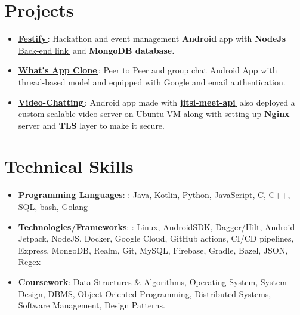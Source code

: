 \documentclass[letterpaper,11pt]{article}
\let\orighref\href
\renewcommand{\href}[2]{\orighref{#1}{#2\,\faExternalLink}}
\newcommand{\resumeItem}[2]{
  \item\small{
    \textbf{#1}{: #2 \vspace{-2pt}}
  }
}
\newcommand{\resumeSubHeadingListStart}{\begin{itemize}[leftmargin=*]}
\newcommand{\resumeSubHeadingListEnd}{\end{itemize}}
\begin{document}
\section{Projects}
\resumeSubHeadingListStart
\resumeItem{\href{https://github.com/yash10019coder/festify-android}{Festify}}
{Hackathon and event management \textbf{Android} app with \textbf{NodeJs} \href{https://github.com/yash10019coder/festify-node-server}{Back-end link} and \textbf{MongoDB database.}}
\resumeItem{\href{https://github.com/yash10019coder/Whats-App}{What's App Clone}}
{Peer to Peer and group chat Android App with thread-based model and equipped with Google and email authentication.}
\resumeItem{\href{https://github.com/yash10019coder/Video-Chatting}{Video-Chatting}}
{Android app made with \href{https://github.com/jitsi/jitsi-meet}{\textbf{jitsi-meet-api}} also deployed a custom scalable video server on Ubuntu VM along with setting up \textbf{Nginx} server and \textbf{TLS} layer to make it secure.}
\resumeSubHeadingListEnd
\section{Technical Skills}
\resumeSubHeadingListStart
\resumeItem{Programming Languages}{: Java, Kotlin, Python, JavaScript, C, C++, SQL, bash, Golang}
\resumeItem{Technologies/Frameworks}{: Linux, AndroidSDK, Dagger/Hilt, Android Jetpack, NodeJS, Docker, Google Cloud, GitHub actions, CI/CD pipelines, Express, MongoDB, Realm, Git, MySQL, Firebase, Gradle, Bazel, JSON, Regex}
\resumeItem{Coursework}{Data Structures \& Algorithms, Operating System, System Design, DBMS, Object Oriented Programming, Distributed Systems, Software Management, Design Patterns.}
\resumeSubHeadingListEnd
\end{document}
